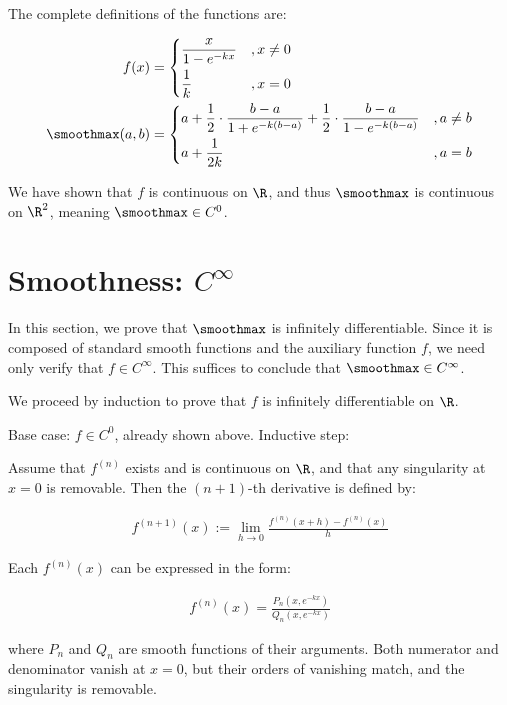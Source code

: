 The complete definitions of the functions are:

\begin{align}
    f(x) &= \begin{dcases}
        \frac{x}{1 - e^{-kx}} &, x \neq 0 \\
        \frac{1}{k} &, x = 0
    \end{dcases} \\
    \smoothmax(a, b) &= \begin{dcases}
        a + \frac{1}{2} \cdot \frac{b - a}{1 + e^{-k(b - a)}} + \frac{1}{2} \cdot \frac{b - a}{1 - e^{-k(b - a)}} &, a \neq b \\
        a + \frac{1}{2k} &, a = b
    \end{dcases}
\end{align}

We have shown that $f$ is continuous on $\R$, and thus $\smoothmax$ is continuous on $\R^2$, meaning $\smoothmax \in C^0$.

\section{Smoothness: $C^\infty$}

In this section, we prove that $\smoothmax$ is infinitely differentiable. Since it is composed of standard smooth functions and the auxiliary function $f$, we need only verify that $f \in C^\infty$. This suffices to conclude that $\smoothmax \in C^\infty$.

We proceed by induction to prove that $f$ is infinitely differentiable on $\R$.

\begin{Itemize}
    \Item{$\bullet$} Base case: $f \in C^0$, already shown above.
    \Item{$\bullet$} Inductive step:
    
    Assume that $f^{(n)}$ exists and is continuous on $\R$, and that any singularity at $x = 0$ is removable. Then the $(n+1)$-th derivative is defined by:
    
    \begin{align}
        f^{(n+1)}(x) := \lim_{h \to 0} \frac{f^{(n)}(x + h) - f^{(n)}(x)}{h}
    \end{align}
    
    Each $f^{(n)}(x)$ can be expressed in the form:
    
    \begin{align}
        f^{(n)}(x) = \frac{P_n(x, e^{-kx})}{Q_n(x, e^{-kx})}
    \end{align}
    
    where $P_n$ and $Q_n$ are smooth functions of their arguments. Both numerator and denominator vanish at $x = 0$, but their orders of vanishing match, and the singularity is removable.
\end{Itemize}

